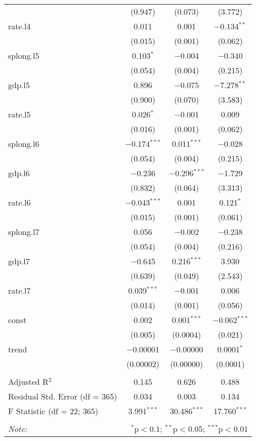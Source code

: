\begin{table}[!htbp]
\begin{tabular}{@{\extracolsep{5pt}}lccc}
  & (0.947) & (0.073) & (3.772) \\ 
  rate.l4 & 0.011 & 0.001 & $-$0.134$^{**}$ \\ 
  & (0.015) & (0.001) & (0.062) \\ 
  splong.l5 & 0.103$^{*}$ & $-$0.004 & $-$0.340 \\ 
  & (0.054) & (0.004) & (0.215) \\ 
  gdp.l5 & 0.896 & $-$0.075 & $-$7.278$^{**}$ \\ 
  & (0.900) & (0.070) & (3.583) \\ 
  rate.l5 & 0.026$^{*}$ & $-$0.001 & 0.009 \\ 
  & (0.016) & (0.001) & (0.062) \\ 
  splong.l6 & $-$0.174$^{***}$ & 0.011$^{***}$ & $-$0.028 \\ 
  & (0.054) & (0.004) & (0.215) \\ 
  gdp.l6 & $-$0.236 & $-$0.296$^{***}$ & $-$1.729 \\ 
  & (0.832) & (0.064) & (3.313) \\ 
  rate.l6 & $-$0.043$^{***}$ & 0.001 & 0.121$^{*}$ \\ 
  & (0.015) & (0.001) & (0.061) \\ 
  splong.l7 & 0.056 & $-$0.002 & $-$0.238 \\ 
  & (0.054) & (0.004) & (0.216) \\ 
  gdp.l7 & $-$0.645 & 0.216$^{***}$ & 3.930 \\ 
  & (0.639) & (0.049) & (2.543) \\ 
  rate.l7 & 0.039$^{***}$ & $-$0.001 & 0.006 \\ 
  & (0.014) & (0.001) & (0.056) \\ 
  const & 0.002 & 0.001$^{***}$ & $-$0.062$^{***}$ \\ 
  & (0.005) & (0.0004) & (0.021) \\ 
  trend & $-$0.00001 & $-$0.00000 & 0.0001$^{*}$ \\ 
  & (0.00002) & (0.00000) & (0.0001) \\ 
 \hline \\[-1.8ex] 
Adjusted R$^{2}$ & 0.145 & 0.626 & 0.488 \\ 
Residual Std. Error (df = 365) & 0.034 & 0.003 & 0.134 \\ 
F Statistic (df = 22; 365) & 3.991$^{***}$ & 30.486$^{***}$ & 17.760$^{***}$ \\ 
\hline 
\hline \\[-1.8ex] 
\textit{Note:}  & \multicolumn{3}{r}{$^{*}$p$<$0.1; $^{**}$p$<$0.05; $^{***}$p$<$0.01} \\ 
\end{tabular} 
\end{table} 

